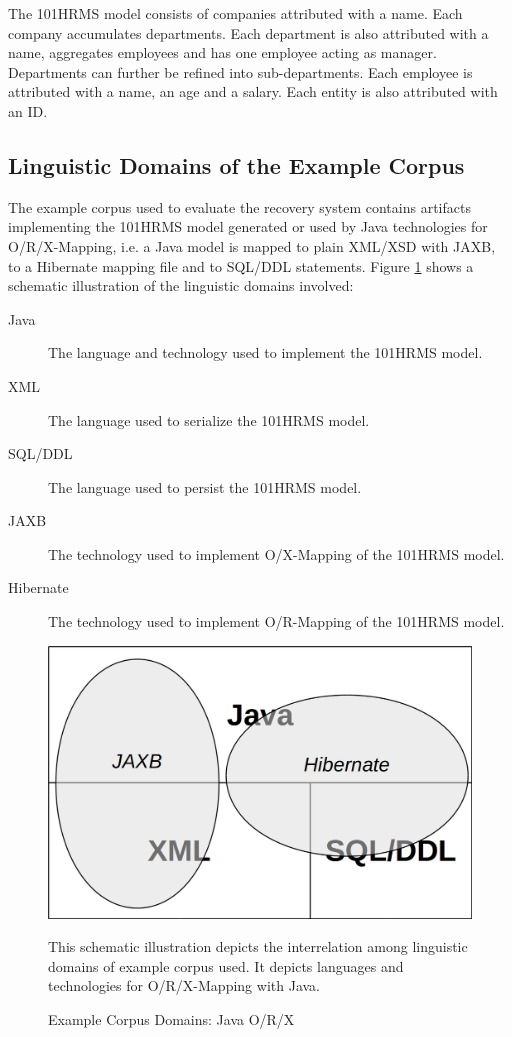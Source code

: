 The \gls{101HRMS} model consists of companies attributed with a name.
Each company accumulates departments.
Each department is also attributed with a name, aggregates employees and has one employee acting as manager.
Departments can further be refined into sub-departments.
Each employee is attributed with a name, an age and a salary.
Each entity is also attributed with an ID.

\subsection{Linguistic Domains of the Example Corpus}
The example corpus used to evaluate the recovery system contains artifacts implementing the \gls{101HRMS} model generated or used by \gls{Java} technologies for \gls{O/R/X-Mapping}, i.e. a \gls{Java} model is mapped to plain \gls{XML}/\gls{XSD} with \gls{JAXB}, to a \gls{Hibernate} mapping file and to \gls{SQL}/\gls{DDL} statements.
Figure \ref{figure:ExampleCorpusJORXDomains} shows a schematic illustration of the linguistic domains involved:
\begin{description}

\item[Java]
The language and technology used to implement the \gls{101HRMS} model.

\item[XML]
The language used to serialize the \gls{101HRMS} model.

\item[SQL/DDL]
The language used to persist the \gls{101HRMS} model.

\item[JAXB]
The technology used to implement \gls{O/X-Mapping} of the \gls{101HRMS} model.

\item[Hibernate]
The technology used to implement \gls{O/R-Mapping} of the \gls{101HRMS} model.

\end{description}

\begin{figure}[h!]
\begin{center}
\includegraphics[width=.6\textwidth]{images/JORXDomains.png}
\end{center}
{
\scriptsize 
This schematic illustration depicts the interrelation among linguistic domains of example corpus used.
It depicts languages and technologies for \gls{O/R/X-Mapping} with \gls{Java}.
}
\caption{Example Corpus Domains: Java O/R/X}
\label{figure:ExampleCorpusJORXDomains}
\end{figure}

